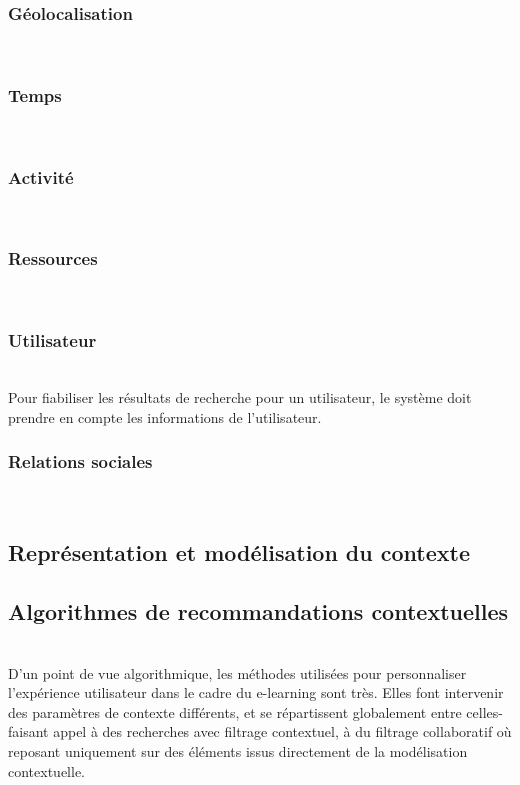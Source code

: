 \documentclass[conference]{./sty/IEEEtran}
\begin{document}
\subsubsection{Géolocalisation}
~\\

\subsubsection{Temps}
~\\

\subsubsection{Activité}
~\\

\subsubsection{Ressources}
~\\

\subsubsection{Utilisateur}
~\\
Pour fiabiliser les résultats de recherche pour un utilisateur, le système doit
prendre en compte les informations de l'utilisateur. \\

\subsubsection{Relations sociales}
~\\

\subsection{Représentation et modélisation du contexte}

\subsection{Algorithmes de recommandations contextuelles}
~\\D'un point de vue algorithmique, les méthodes utilisées pour personnaliser l'expérience utilisateur dans le cadre du e-learning sont très. Elles font intervenir des paramètres de contexte différents, et se répartissent globalement entre celles-faisant appel à des recherches avec filtrage contextuel, à du filtrage collaboratif où reposant uniquement sur des éléments issus directement de la modélisation contextuelle.
\end{document}
